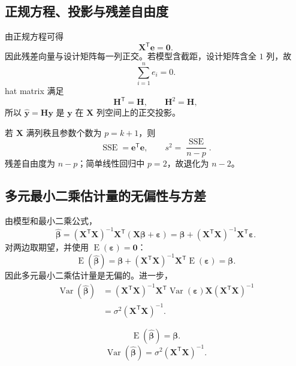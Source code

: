 \documentclass[11pt,a4paper]{article}
\theoremstyle{definition}
\theoremstyle{plain}
\theoremstyle{remark}
\newcommand{\E}{\operatorname{E}}
\newcommand{\Var}{\operatorname{Var}}
\begin{document}
\subsection{正规方程、投影与残差自由度}

由正规方程可得
\[
    \boldsymbol X^{\mathsf T}\boldsymbol e=\boldsymbol0.
\]
因此残差向量与设计矩阵每一列正交。若模型含截距，设计矩阵含全 $1$ 列，故
\[
    \sum_{i=1}^n e_i=0.
\]
hat matrix 满足
\[
    \boldsymbol H^{\mathsf T}=\boldsymbol H,\qquad
    \boldsymbol H^2=\boldsymbol H,
\]
所以 $\hat{\boldsymbol y}=\boldsymbol H\boldsymbol y$ 是 $\boldsymbol y$ 在
$\boldsymbol X$ 列空间上的正交投影。

\begin{memorybox}
若 $\boldsymbol X$ 满列秩且参数个数为 $p=k+1$，则
\[
    \boxed{
    \operatorname{SSE}
    =
    \boldsymbol e^{\mathsf T}\boldsymbol e,
    \qquad
    s^2=\frac{\operatorname{SSE}}{n-p}.
    }
\]
残差自由度为 $n-p$；简单线性回归中 $p=2$，故退化为 $n-2$。
\end{memorybox}

\subsection{多元最小二乘估计量的无偏性与方差}

由模型和最小二乘公式，
\[
    \hat{\boldsymbol\beta}
    =
    (\boldsymbol X^{\mathsf T}\boldsymbol X)^{-1}
    \boldsymbol X^{\mathsf T}
    (\boldsymbol X\boldsymbol\beta+\boldsymbol\varepsilon)
    =
    \boldsymbol\beta+
    (\boldsymbol X^{\mathsf T}\boldsymbol X)^{-1}
    \boldsymbol X^{\mathsf T}\boldsymbol\varepsilon.
\]
对两边取期望，并使用 $\E(\boldsymbol\varepsilon)=\boldsymbol0$：
\[
    \E(\hat{\boldsymbol\beta})
    =
    \boldsymbol\beta+
    (\boldsymbol X^{\mathsf T}\boldsymbol X)^{-1}
    \boldsymbol X^{\mathsf T}\E(\boldsymbol\varepsilon)
    =
    \boldsymbol\beta.
\]
因此多元最小二乘估计量是无偏的。进一步，
\begin{align}
    \Var(\hat{\boldsymbol\beta})
    &=
    (\boldsymbol X^{\mathsf T}\boldsymbol X)^{-1}
    \boldsymbol X^{\mathsf T}
    \Var(\boldsymbol\varepsilon)
    \boldsymbol X
    (\boldsymbol X^{\mathsf T}\boldsymbol X)^{-1}\\
    &=
    \sigma^2(\boldsymbol X^{\mathsf T}\boldsymbol X)^{-1}.
\end{align}

\begin{memorybox}
\[
    \boxed{\E(\hat{\boldsymbol\beta})=\boldsymbol\beta.}
\]
\[
    \boxed{
    \Var(\hat{\boldsymbol\beta})
    =
    \sigma^2(\boldsymbol X^{\mathsf T}\boldsymbol X)^{-1}.
    }
\]
\end{memorybox}
\end{document}
